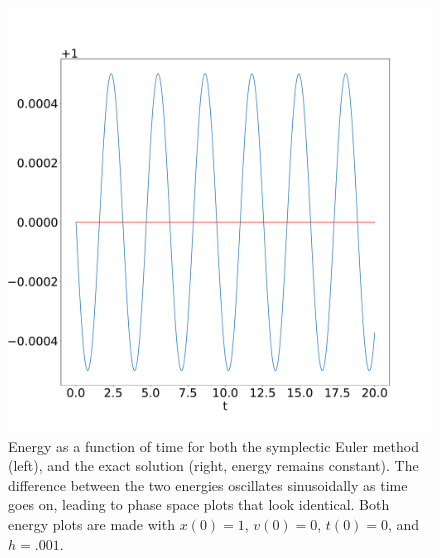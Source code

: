\documentclass[11pt, oneside]{article}   	%
\begin{document}
\begin{section}
\begin{figure}[H]
\centerline{\includegraphics[width=.7\textwidth, height=.5\textheight]{sympError.pdf}}
\caption{Energy as a function of time for both the symplectic Euler method (left), and the exact solution (right, energy remains constant). The difference between the two energies oscillates sinusoidally as time goes on, leading to phase space plots that look identical. Both energy plots are made with $x(0) = 1$, $v(0) = 0$, $t(0) = 0$, and $h = .001$.}
\end{figure}

\end{section}
\end{document}
